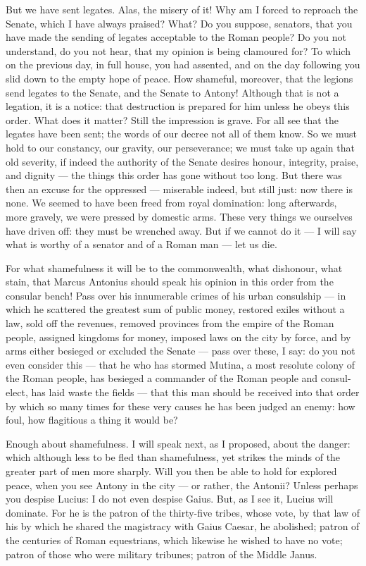  But we have sent legates. Alas, the misery of it! Why am I forced to reproach the Senate, which I have always praised? What? Do you suppose, senators, that you have made the sending of legates acceptable to the Roman people? Do you not understand, do you not hear, that my opinion is being clamoured for? To which on the previous day, in full house, you had assented, and on the day following you slid down to the empty hope of peace. How shameful, moreover, that the legions send legates to the Senate, and the Senate to Antony! Although that is not a legation, it is a notice: that destruction is prepared for him unless he obeys this order. What does it matter? Still the impression is grave. For all see that the legates have been sent; the words of our decree not all of them know. So we must hold to our constancy, our gravity, our perseverance; we must take up again that old severity, if indeed the authority of the Senate desires honour, integrity, praise, and dignity --- the things this order has gone without too long. But there was then an excuse for the oppressed --- miserable indeed, but still just: now there is none. We seemed to have been freed from royal domination: long afterwards, more gravely, we were pressed by domestic arms. These very things we ourselves have driven off: they must be wrenched away. But if we cannot do it --- I will say what is worthy of a senator and of a Roman man --- let us die.

 For what shamefulness it will be to the commonwealth, what dishonour, what stain, that Marcus Antonius should speak his opinion in this order from the consular bench! Pass over his innumerable crimes of his urban consulship --- in which he scattered the greatest sum of public money, restored exiles without a law, sold off the revenues, removed provinces from the empire of the Roman people, assigned kingdoms for money, imposed laws on the city by force, and by arms either besieged or excluded the Senate --- pass over these, I say: do you not even consider this --- that he who has stormed Mutina, a most resolute colony of the Roman people, has besieged a commander of the Roman people and consul-elect, has laid waste the fields --- that this man should be received into that order by which so many times for these very causes he has been judged an enemy: how foul, how flagitious a thing it would be?

 Enough about shamefulness. I will speak next, as I proposed, about the danger: which although less to be fled than shamefulness, yet strikes the minds of the greater part of men more sharply. Will you then be able to hold for explored peace, when you see Antony in the city --- or rather, the Antonii? Unless perhaps you despise Lucius: I do not even despise Gaius. But, as I see it, Lucius will dominate. For he is the patron of the thirty-five tribes, whose vote, by that law of his by which he shared the magistracy with Gaius Caesar, he abolished; patron of the centuries of Roman equestrians, which likewise he wished to have no vote; patron of those who were military tribunes; patron of the Middle Janus.

